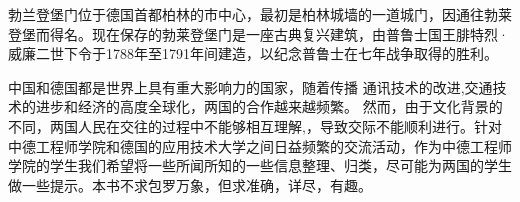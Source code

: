  \vspace*{3cm}
\begin{minipage}{\linewidth}
    \Huge\heiti{} \par
\end{minipage}

 \vspace*{3cm}

\par
勃兰登堡门位于德国首都柏林的市中心，最初是柏林城墙的一道城门，因通往勃莱登堡而得名。现在保存的勃莱登堡门是一座古典复兴建筑，由普鲁士国王腓特烈·威廉二世下令于1788年至1791年间建造，以纪念普鲁士在七年战争取得的胜利。
\cleardoublepage

\begin{minipage}{\linewidth}
\Huge\heiti{} \par
\end{minipage}

 \vspace*{3cm}
 中国和德国都是世界上具有重大影响力的国家，随着传播 通讯技术的改进,交通技术的进步和经济的高度全球化，两国的合作越来越频繁。 然而，由于文化背景的不同，两国人民在交往的过程中不能够相互理解,，导致交际不能顺利进行。针对中德工程师学院和德国的应用技术大学之间日益频繁的交流活动，作为中德工程师学院的学生我们希望将一些所闻所知的一些信息整理、归类，尽可能为两国的学生做一些提示。本书不求包罗万象，但求准确，详尽，有趣。

